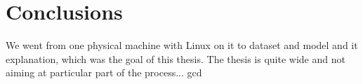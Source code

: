 \chapter{Conclusions} \label{chap:concl}
 We went from one physical machine with Linux on it to dataset and model and it explanation, which was the goal of this thesis. The thesis is quite wide and not aiming at particular part of the process... \acrshort{gcd}

